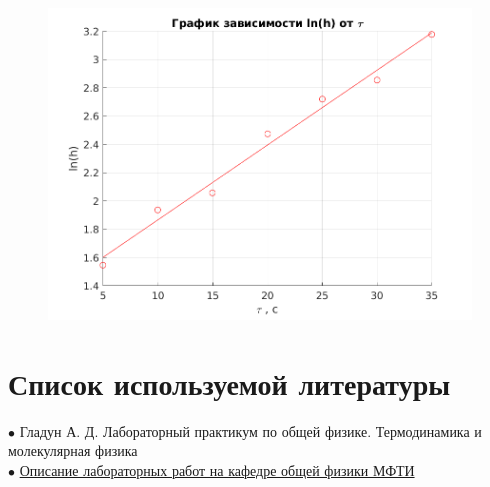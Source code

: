 \documentclass[a4paper,11.5pt]{article} %
\begin{document}
\begin{flushleft}

	\begin{figure}[!h]
		\includegraphics[scale = 0.85]{graph_1.png}
	\end{figure}

\end{flushleft}

\section{Список используемой литературы}

$\bullet$ Гладун А. Д. Лабораторный практикум по общей физике. Термодинамика и молекулярная физика\\

$\bullet$ \href{https://mipt.ru/education/chair/physics/S_II/lab/}{Описание лабораторных работ на кафедре общей физики МФТИ}

\newpage
\end{document}
